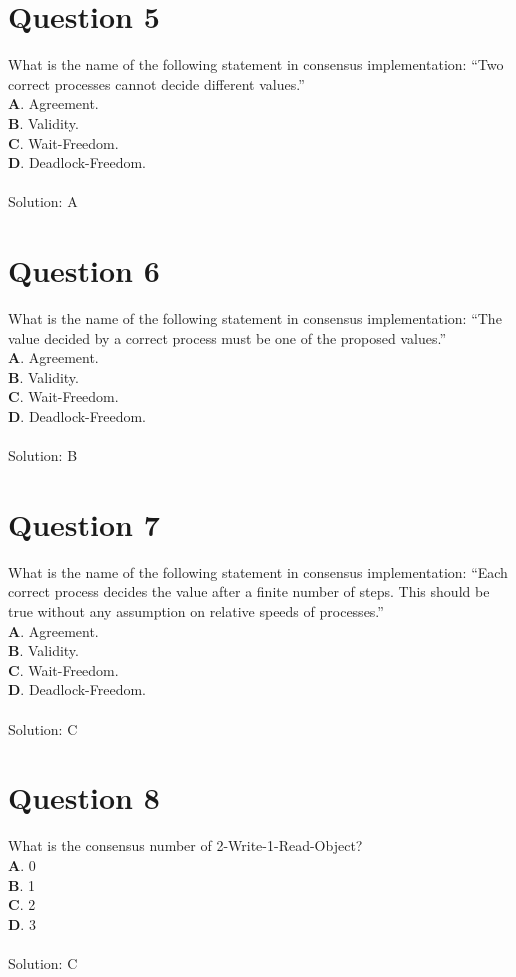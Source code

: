 \documentclass[twoside]{article}
\begin{document}
\section*{Question 5}
What is the name of the following statement in consensus implementation: “Two correct processes cannot decide diﬀerent values.” \\ 
\textbf{A}. Agreement. \\
\textbf{B}. Validity. \\
\textbf{C}. Wait-Freedom. \\
\textbf{D}. Deadlock-Freedom. \\ \\ 
Solution: A

\section*{Question 6}
What is the name of the following statement in consensus implementation: “The value decided by a correct process must be one of the proposed values.” \\ 
\textbf{A}. Agreement. \\
\textbf{B}. Validity. \\
\textbf{C}. Wait-Freedom. \\
\textbf{D}. Deadlock-Freedom. \\ \\ 
Solution: B

\section*{Question 7}
What is the name of the following statement in consensus implementation: “Each correct process decides the value after a ﬁnite number of steps. This should be true without any assumption on relative speeds of processes.” \\ 
\textbf{A}. Agreement. \\
\textbf{B}. Validity. \\
\textbf{C}. Wait-Freedom. \\
\textbf{D}. Deadlock-Freedom. \\ \\ 
Solution: C

\section*{Question 8}
What is the consensus number of 2-Write-1-Read-Object?
 \\ 
\textbf{A}. 0 \\
\textbf{B}. 1 \\
\textbf{C}. 2 \\
\textbf{D}. 3 \\ \\
Solution: C
\end{document}
